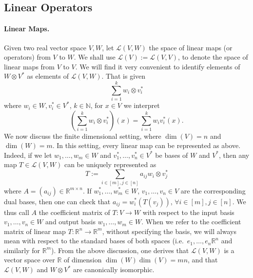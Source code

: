 \documentclass[11pt]{article}
\theoremstyle{plain}
\theoremstyle{plain}
\newcommand{\R}{\ensuremath{\mathbb{R}}}
\newcommand{\N}{\ensuremath{\mathbb{N}}}
\begin{document}
\subsection{Linear Operators}

\paragraph{\bf Linear Maps.}
Given two real vector space $V, W$, let $\mathcal{L}(V,W)$ the space of linear
maps (or operators) from $V$ to $W$. We shall use $\mathcal{L}(V) :=
\mathcal{L}(V,V)$, to denote the space of linear maps from $V$ to $V$. We will
find it very convenient to identify elements of $W \otimes V^*$ as elements of
$\mathcal{L}(V,W)$. That is given
\[
\sum_{i=1}^k w_i \otimes v_i^*
\]
where $w_i \in W, v_i^* \in V^*$, $k \in \N$, for $x \in V$ we interpret
\[
(\sum_{i=1}^k w_i \otimes v_i^*)(x) = \sum_{i=1}^k w_i v_i^*(x).
\]
We now discuss the finite dimensional setting, where $\dim(V) = n$ and $\dim(W)
= m$. In this setting, every linear map can be represented as above. Indeed,
if we let $w_1,\dots,w_m \in W$ and $v_1^*,\dots,v_n^* \in V^*$ be bases of $W$
and $V^*$, then any map $T \in \mathcal{L}(V,W)$ can be uniquely represented as
\[
T := \sum_{i \in [m], j \in [n]} a_{ij} w_i \otimes v_j^*
\]
where $A = (a_{ij}) \in \R^{m \times n}$. If $w_1^*,\dots,w_m^* \in W$,
$v_1,\dots,v_n \in V$ are the corresponding dual bases, then one can check that
$a_{ij} = w_i^*(T(v_j))$, $\forall i \in [m], j \in [n]$. We thus call $A$ the
coefficient matrix of $T:V\rightarrow W$ with respect to the input basis
$v_1,\dots,v_n \in W$ and output basis $w_1,\dots,w_m \in W$. When we refer to
the coefficient matrix of linear map $T: \R^n \rightarrow \R^m$, without
specifying the basis, we will always mean with respect to the standard bases of
both spaces (i.e.~$e_1,\dots,e_n \R^n$ and similarly for $\R^m$). From the
above discussion, one derives that $\mathcal{L}(V,W)$ is a vector space over
$\R$ of dimension $\dim(W) \dim(V) = m n$, and that $\mathcal{L}(V,W)$ and $W
\otimes V^*$ are canonically isomorphic. 
\end{document}
